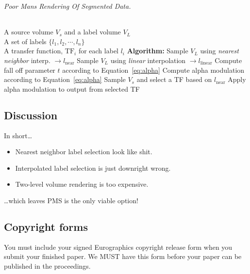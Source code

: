 \documentclass{egpubl}
\begin{document}
\begin{algorithm}[t]
\renewcommand{\thealgorithm}{1}
\caption{\label{code:recon} \emph{Poor Mans Rendering Of Segmented Data.}}
\begin{algorithmic}
\REQUIRE \quad\\
A source volume $V_s$ and a label volume $V_L$ \\
A set of labels $\{ l_1, l_2, \cdots, l_n \}$ \\
A transfer function, $\mathrm{TF}_i$ for each label $l_i$ 
\STATE \hspace{-3mm}\textbf{Algorithm:}
 \nonumber
\STATE Sample $V_L$ using \emph{nearest neighbor} interp. $\rightarrow l_\mathrm{near}$
\STATE Sample $V_L$ using \emph{linear} interpolation $\rightarrow l_\mathrm{linear}$
\STATE Compute fall off parameter $t$ according to Equation~\ref{eq:alpha}
\STATE Compute alpha modulation according to Equation~\ref{eq:alpha}
\STATE Sample $V_s$ and select a TF based on $l_\mathrm{near}$
\STATE Apply alpha modulation to output from selected TF
\ENDFOR
\end{algorithmic}
\end{algorithm}


\subsection{Discussion}

In short\dots
\begin{itemize}
\item Nearest neighbor label selection look like shit. 
\item Interpolated label selection is just downright wrong. 
\item Two-level volume rendering is too expensive. 
\end{itemize}
\dots which leaves PMS is the only viable option!

\subsection{Copyright forms}

You must include your signed Eurographics copyright release form
when you submit your finished paper. We MUST have this form before
your paper can be published in the proceedings.





\end{document}
